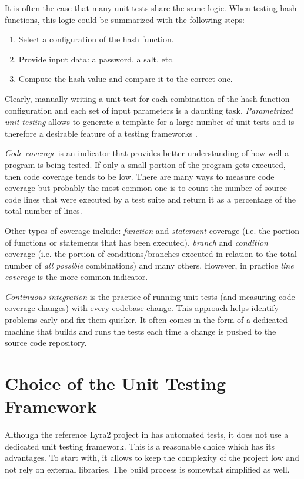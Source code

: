 It is often the case that many unit tests share the same logic. When testing hash functions, this logic could be summarized with the following steps:

\begin{enumerate}
    \item Select a configuration of the hash function.
    \item Provide input data: a password, a salt, etc.
    \item Compute the hash value and compare it to the correct one.
   \end{enumerate}

Clearly, manually writing a unit test for each combination of the hash function configuration and each set of input parameters is a daunting task. \emph{Parametrized unit testing} allows to generate a template for a large number of unit tests and is therefore a desirable feature of a testing frameworks \cite{tillmann:2010:parametrized-unit-tests-rock}.

\emph{Code coverage} is an indicator that provides better understanding of how well a program is being tested. If only a small portion of the program gets executed, then code coverage tends to be low. There are many ways to measure code coverage but probably the most common one is to count the number of source code lines that were executed by a test suite and return it as a percentage of the total number of lines.

Other types of coverage include: \emph{function} and \emph{statement} coverage (i.e. the portion of functions or statements that has been executed), \emph{branch} and \emph{condition} coverage (i.e. the portion of conditions/branches executed in relation to the total number of \emph{all possible} combinations) and many others. However, in practice \emph{line coverage} is the more common indicator.

\emph{Continuous integration} is the practice of running unit tests (and measuring code coverage changes) with every codebase change. This approach helps identify problems early and fix them quicker. It often comes in the form of a dedicated machine that builds and runs the tests each time a change is pushed to the source code repository.

\section{Choice of the Unit Testing Framework}

Although the reference Lyra2 project in \cite{github:2017:lyra} has automated tests, it does not use a dedicated unit testing framework. This is a reasonable choice which has its advantages. To start with, it allows to keep the complexity of the project low and not rely on external libraries. The build process is somewhat simplified as well.

